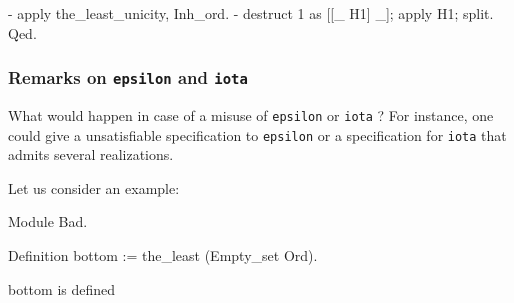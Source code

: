 \begin{Coqsrc}
  -  apply the_least_unicity, Inh_ord.
  -  destruct 1 as [[_ H1] _]; apply H1; split. 
Qed.
\end{Coqsrc}

\subsubsection{Remarks on \texttt{epsilon} and \texttt{iota}}

 What would happen in case of a misuse of \texttt{epsilon} or \texttt{iota} ?
For instance, one could give a unsatisfiable specification to \texttt{epsilon} or 
a specification for \texttt{iota} that admits several realizations.

Let us consider an example:

\begin{Coqbad}
Module Bad.

 Definition bottom := the_least (Empty_set Ord).
\end{Coqbad}

\begin{Coqanswer}
 bottom is defined
\end{Coqanswer}


